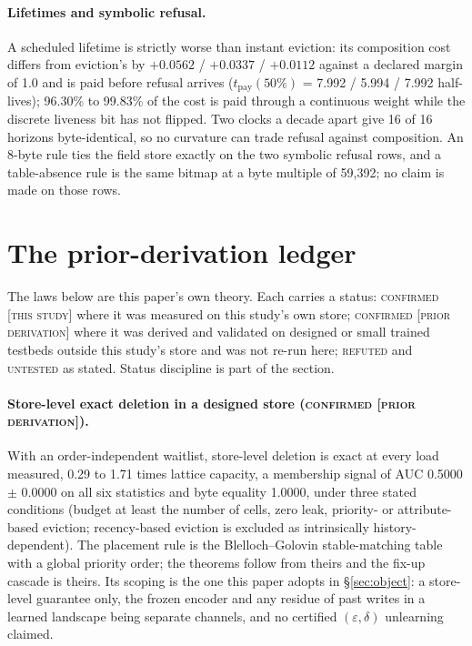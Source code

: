 \documentclass{article} %
\begin{document}
\paragraph{Lifetimes and symbolic refusal.} A scheduled lifetime is strictly worse than instant
eviction: its composition cost differs from eviction's by $+0.0562$ / $+0.0337$ / $+0.0112$ against a
declared margin of 1.0 and is paid before refusal arrives ($t_{\text{pay}}(50\%)$ = 7.992 / 5.994 /
7.992 half-lives); 96.30\% to 99.83\% of the cost is paid through a continuous weight while the
discrete liveness bit has not flipped. %
Two clocks a decade apart give 16 of 16 horizons byte-identical, so no curvature can trade refusal
against composition. An 8-byte rule ties the field store exactly on the two symbolic refusal rows,
and a table-absence rule is the same bitmap at a byte multiple of 59,392; no claim is made on those
rows. %

\section{The prior-derivation ledger}
\label{app:shorts}

The laws below
are this paper's own theory. Each carries a status: \textsc{confirmed [this study]} where it was
measured on this study's own store; \textsc{confirmed [prior derivation]} where it was derived and
validated on designed or small trained testbeds outside this study's store and was not re-run
here; \textsc{refuted} and \textsc{untested} as stated. Status discipline is part of the section.


\paragraph{Store-level exact deletion in a designed store (\textsc{confirmed [prior
derivation]}).} With an order-independent waitlist, store-level deletion is exact at every load
measured, 0.29 to 1.71 times lattice capacity, a membership signal of AUC 0.5000 $\pm$ 0.0000 on all
six statistics and byte equality 1.0000, under three stated conditions (budget at least the number
of cells, zero leak, priority- or attribute-based eviction; recency-based eviction is excluded as
intrinsically history-dependent). %
The placement rule is the Blelloch--Golovin stable-matching table~\citep{blelloch2007strongly} with a global priority order;
the theorems follow from theirs and the fix-up cascade is theirs. Its scoping is the one this
paper adopts in \S\ref{sec:object}: a store-level guarantee only, the frozen encoder and any
residue of past writes in a learned landscape being separate channels, and no certified
$(\varepsilon,\delta)$ unlearning claimed. %
\end{document}
